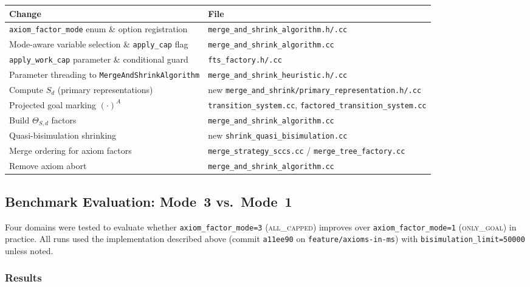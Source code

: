 \documentclass[11pt,a4paper]{article}
\begin{document}
\begin{center}
\begin{tabular}{ll}
\toprule
\textbf{Change} & \textbf{File} \\
\midrule
\texttt{axiom\_factor\_mode} enum \& option registration &
  \texttt{merge\_and\_shrink\_algorithm.h/.cc} \\
Mode-aware variable selection \& \texttt{apply\_cap} flag &
  \texttt{merge\_and\_shrink\_algorithm.cc} \\
\texttt{apply\_work\_cap} parameter \& conditional guard &
  \texttt{fts\_factory.h/.cc} \\
Parameter threading to \texttt{MergeAndShrinkAlgorithm} &
  \texttt{merge\_and\_shrink\_heuristic.h/.cc} \\
\midrule
Compute $S_d$ (primary representations) &
  new \texttt{merge\_and\_shrink/primary\_representation.h/.cc} \\
Projected goal marking $(\cdot)^A$ &
  \texttt{transition\_system.cc},
  \texttt{factored\_transition\_system.cc} \\
Build $\Theta_{S,d}$ factors &
  \texttt{merge\_and\_shrink\_algorithm.cc} \\
Quasi-bisimulation shrinking &
  new \texttt{shrink\_quasi\_bisimulation.cc} \\
Merge ordering for axiom factors &
  \texttt{merge\_strategy\_sccs.cc} / \texttt{merge\_tree\_factory.cc} \\
Remove axiom abort &
  \texttt{merge\_and\_shrink\_algorithm.cc} \\
\bottomrule
\end{tabular}
\end{center}

\subsection{Benchmark Evaluation: Mode~3 vs.\ Mode~1}
\label{sec:mode3-benchmark}

Four domains were tested to evaluate whether \texttt{axiom\_factor\_mode=3}
(\textsc{all\_capped}) improves over \texttt{axiom\_factor\_mode=1}
(\textsc{only\_goal}) in practice.  All runs used the implementation
described above (commit \texttt{a11ee90} on \texttt{feature/axioms-in-ms})
with \texttt{bisimulation\_limit=50000} unless noted.

\subsubsection*{Results}
\end{document}
